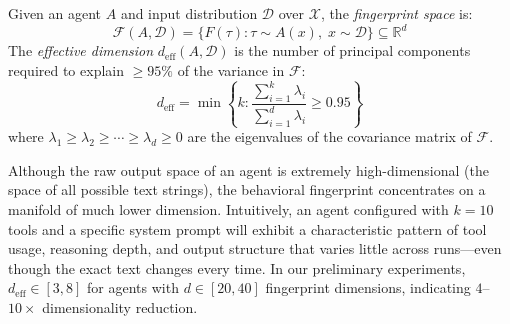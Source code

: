 \begin{definition}
\label{def:fingerprint-space}
Given an agent $A$ and input distribution $\mathcal{D}$ over
$\mathcal{X}$, the \emph{fingerprint space} is:
\begin{equation}
\label{eq:fingerprint-space}
  \mathcal{F}(A, \mathcal{D}) = \{F(\tau) : \tau \sim A(x),\;
    x \sim \mathcal{D}\} \subseteq \mathbb{R}^d
\end{equation}
The \emph{effective dimension} $d_{\mathrm{eff}}(A, \mathcal{D})$ is
the number of principal components required to explain $\geq 95\%$ of
the variance in $\mathcal{F}$:
\begin{equation}
\label{eq:deff}
  d_{\mathrm{eff}} = \min\left\{k :
    \frac{\sum_{i=1}^{k} \lambda_i}{\sum_{i=1}^{d} \lambda_i}
    \geq 0.95\right\}
\end{equation}
where $\lambda_1 \geq \lambda_2 \geq \cdots \geq \lambda_d \geq 0$ are
the eigenvalues of the covariance matrix of $\mathcal{F}$.
\end{definition}

\begin{remark}
\label{rem:manifold}
Although the raw output space of an agent is extremely
high-dimensional (the space of all possible text strings), the
behavioral fingerprint concentrates on a manifold of much lower
dimension. Intuitively, an agent configured with $k = 10$ tools and a
specific system prompt will exhibit a characteristic pattern of tool
usage, reasoning depth, and output structure that varies little across
runs---even though the exact text changes every time. In our
preliminary experiments, $d_{\mathrm{eff}} \in [3, 8]$ for agents with
$d \in [20, 40]$ fingerprint dimensions, indicating $4$--$10\times$
dimensionality reduction.
\end{remark}

